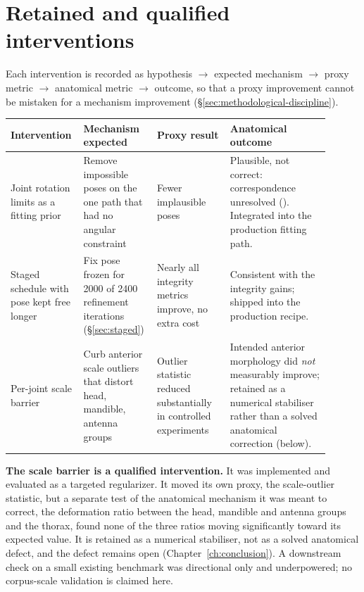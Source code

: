 \section{Retained and qualified interventions}
\label{sec:retained}

Each intervention is recorded as hypothesis $\rightarrow$ expected mechanism
$\rightarrow$ proxy metric $\rightarrow$ anatomical metric $\rightarrow$
outcome, so that a proxy improvement cannot be mistaken for a mechanism
improvement (\S\ref{sec:methodological-discipline}).

\begin{center}
\small
\begin{tabular}{@{}p{0.16\linewidth}p{0.22\linewidth}p{0.22\linewidth}p{0.30\linewidth}@{}}
\toprule
\textbf{Intervention} & \textbf{Mechanism expected} & \textbf{Proxy result} & \textbf{Anatomical outcome} \\
\midrule
Joint rotation limits as a fitting prior & Remove impossible poses on the one
  path that had no angular constraint & Fewer implausible poses &
  Plausible, not correct: correspondence unresolved (\F{F1}). Integrated into
  the production fitting path. \\
Staged schedule with pose kept free longer & Fix pose frozen for 2000 of 2400
  refinement iterations (\S\ref{sec:staged}) & Nearly all integrity metrics
  improve, no extra cost & Consistent with the integrity gains; shipped into
  the production recipe. \\
Per-joint scale barrier & Curb anterior scale outliers that distort head,
  mandible, antenna groups & Outlier statistic reduced substantially in
  controlled experiments & Intended anterior morphology did \emph{not}
  measurably improve; retained as a numerical stabiliser rather than a
  solved anatomical correction (below). \\
\bottomrule
\end{tabular}
\end{center}

\textbf{The scale barrier is a qualified intervention.} It was implemented
and evaluated as a targeted regularizer. It moved its own proxy, the
scale-outlier statistic, but a separate test of the anatomical mechanism it
was meant to correct, the deformation ratio between the head, mandible and
antenna groups and the thorax, found none of the three ratios moving
significantly toward its expected value. It is retained as a numerical
stabiliser, not as a solved anatomical defect, and the defect remains open
(Chapter~\ref{ch:conclusion}). A downstream check on a small existing
benchmark was directional only and underpowered; no corpus-scale validation
is claimed here.
